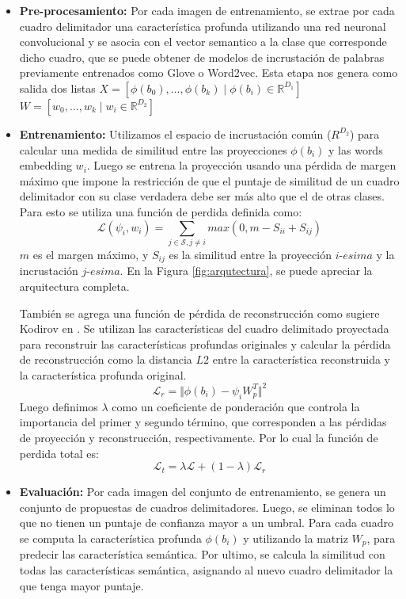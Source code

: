 \begin{itemize}
	\item \textbf{Pre-procesamiento:} Por cada imagen de entrenamiento, se extrae por cada cuadro delimitador una característica profunda utilizando una red neuronal convolucional y se asocia con el vector semantico a la clase que corresponde dicho cuadro, que se puede obtener de modelos de incrustación de palabras previamente entrenados como Glove o Word2vec. Esta etapa nos genera como salida dos listas $X = [\phi(b_0),...,\phi(b_k) \mid \phi(b_i) \in \mathbb{R}^{D_1}]$ $W = [w_0,...,w_k \mid w_i \in \mathbb{R}^{D_2}]$
	\item \textbf{Entrenamiento:} Utilizamos el espacio de incrustación común (${R}^{D_2}$) para calcular una medida de similitud entre las proyecciones  $\phi(b_i)$ y las words embedding $w_i$. Luego se entrena la proyección usando una pérdida de margen máximo que impone la restricción de que el puntaje de similitud de un cuadro delimitador con su clase verdadera debe ser más alto que el de otras clases. Para esto se utiliza una función de perdida definida como: \[\mathcal{L}(\psi_i, w_i) = \sum_{j \in \mathcal{S}, j\neq i} max(0, m - S_{ii} + S_{ij})\] $m$ es el margen máximo, y $S_{ij}$ es la similitud entre la proyección $i$-$esima$ y la incrustación $j$-$esima$. En la Figura \ref{fig:arqutectura}, se puede apreciar la arquitectura completa.
	 
	 También se agrega una función de pérdida de reconstrucción como sugiere Kodirov en \cite{kodirov2017semantic}. Se utilizan las características del cuadro delimitado proyectada para reconstruir las características profundas originales y calcular la pérdida de reconstrucción como la distancia $L2$  entre la característica reconstruida y la característica profunda original. \[\mathcal{L}_r = \Vert{\phi(b_i) - \psi_iW_p^T}\Vert^2 \] Luego definimos $\lambda$ como un coeficiente de ponderación que controla la importancia del primer y segundo término, que corresponden a las pérdidas de proyección y reconstrucción, respectivamente. Por lo cual la función de perdida total es: \[\mathcal{L}_t = \lambda \mathcal{L} + (1-\lambda) \mathcal{L}_r \]
	\item \textbf{Evaluación:} Por cada imagen del conjunto de entrenamiento, se genera un conjunto de propuestas de cuadros delimitadores. Luego, se eliminan todos lo que no tienen un puntaje de confianza mayor a un umbral. Para cada cuadro se computa la característica profunda $\phi(b_i)$ y utilizando la matriz $W_p$, para predecir las característica semántica. Por ultimo, se calcula la similitud con todas las características semántica, asignando al nuevo cuadro delimitador la que tenga mayor puntaje.
\end{itemize}
